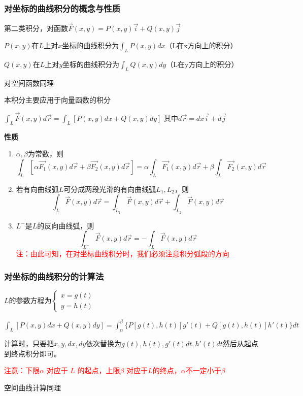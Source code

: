 \documentclass{article} %
\begin{document}
\subsubsection{对坐标的曲线积分的概念与性质}
第二类积分，对函数$\vec{F}(x,y)=P(x,y)\vec{i}+Q(x,y)\vec{j}$\par
$P(x,y)$在$L$上对$x$坐标的曲线积分为$\displaystyle \int_L P(x,y)dx$（L在x方向上的积分）\par
$Q(x,y)$在$L$上对$y$坐标的曲线积分为$\displaystyle \int_L Q(x,y)dy$（L在y方向上的积分）\par
对空间函数同理\par
\vspace{5mm}
本积分主要应用于向量函数的积分\par
$\displaystyle \int_L\vec{F}(x,y)d\vec{r}=\int_{L}[P(x,y)dx+Q(x,y)dy]$
其中$d\vec{r}=dx\vec{i}+d\vec{j}$\par

\vspace{5mm}
\textbf{性质}
\begin{enumerate}
    \item $\alpha,\beta$为常数，则
        $$\displaystyle \int_L[\alpha\vec{F_1}(x,y)d\vec{r}+\beta\vec{F_2}(x,y)d\vec{r}]=
        \alpha\int_{L}\vec{F_1}(x,y)d\vec{r}+\beta\int_{L}\vec{F_2}(x,y)d\vec{r}$$

    \item 若有向曲线弧$L$可分成两段光滑的有向曲线弧$L_1,L_2$，则
        $$\int_L\vec{F}(x,y)d\vec{r}=\int_{L_1}\vec{F}(x,y)d\vec{r}+\int_{L_2}\vec{F}(x,y)d\vec{r}$$
    
    \item $L^-$是$L$的反向曲线弧，则
        $$\int_{L^-}\vec{F}(x,y)d\vec{r}=-\int_{L}\vec{F}(x,y)d\vec{r}$$
        \textcolor{red}{注：由此可知，在对坐标曲线积分时，我们必须注意积分弧段的方向}
\end{enumerate}

\subsubsection{对坐标的曲线积分的计算法}
$L$的参数方程为$\left\{\begin{array}{ll}
    x=g(t)\\
    y=h(t)
\end{array}\right.$\par
$\displaystyle \int_{L}[P(x,y)dx+Q(x,y)dy]=\int_{\alpha}^{\beta}\{P[g(t),h(t)]g'(t)+Q[g(t),h(t)]h'(t)\}dt$
\par
\vspace{3mm}
计算时，只要把$x,y,dx,dy$依次替换为$g(t),h(t),g'(t)dt,h'(t)dt$然后从起点到终点积分即可。\par
\textcolor{red}{注意：下限$\alpha$ 对应于 $L$ 的起点，上限$\beta$ 对应于$L$的终点，$\alpha$不一定小于$\beta$}
\par
\vspace{5mm}
空间曲线计算同理
\end{document}
